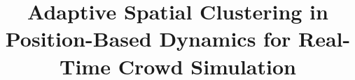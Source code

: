 \documentclass{CSIM}
\begin{document}

\title{Adaptive Spatial Clustering in Position-Based Dynamics for Real-Time Crowd Simulation}
















% 


\newpage{}
\renewcommand\refname{References Cited}




% 



% 

% 

% 

% 

\end{document}

